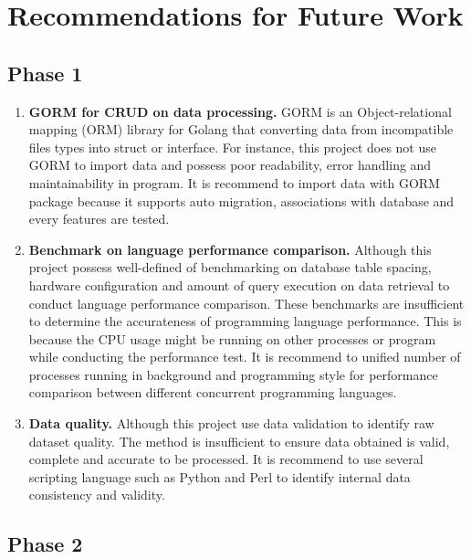 \section{Recommendations for Future Work}

\subsection{Phase 1}

\begin{enumerate}[topsep=0pt,itemsep=-1ex,partopsep=1ex,parsep=1.5ex]
	\item \textbf{GORM for CRUD on data processing.} GORM is an Object-relational mapping (ORM) library for Golang that converting data from incompatible files types into struct or interface. For instance, this project does not use GORM to import data and possess poor readability, error handling and maintainability in program. It is recommend to import data with GORM package because it supports auto migration, associations with database and every features are tested. 
	\linebreak
	
	\item \textbf{Benchmark on language performance comparison.} Although this project possess well-defined of benchmarking on database table spacing, hardware configuration and amount of query execution on data retrieval to conduct language performance comparison. These benchmarks are insufficient to determine the accurateness of programming language performance. This is because the CPU usage might be running on other processes or program while conducting the performance test. It is recommend to unified number of processes running in background and programming style for performance comparison between different concurrent programming languages.
	
	\item \textbf{Data quality.} Although this project use data validation to identify raw dataset quality. The method is insufficient to ensure data obtained is valid, complete and accurate to be processed. It is recommend to use several scripting language such as Python and Perl to identify internal data consistency and validity.
	
\end{enumerate}

\subsection{Phase 2}

